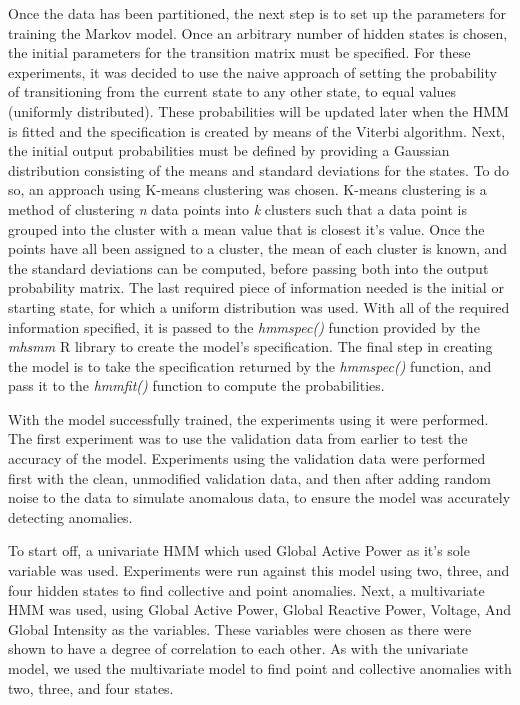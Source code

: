 \documentclass[letterpaper, 11pt]{article}%
\begin{document}
Once the data has been partitioned, the next step is to set up the parameters for training the Markov model. Once an arbitrary number of hidden states is chosen, the initial parameters for the transition matrix must be specified. For these experiments, it was decided to use the naive approach of setting the probability of transitioning from the current state to any other state, to equal values (uniformly distributed). These probabilities will be updated later when the HMM is fitted and the specification is created by means of the Viterbi algorithm. Next, the initial output probabilities must be defined by providing a Gaussian distribution consisting of the means and standard deviations for the states. To do so, an approach using K-means clustering was chosen. K-means clustering is a method of clustering \textit{n} data points into \textit{k} clusters such that a data point is grouped into the cluster with a mean value that is closest it's value. Once the points have all been assigned to a cluster, the mean of each cluster is known, and the standard deviations can be computed, before passing both into the output probability matrix. The last required piece of information needed is the initial or starting state, for which a uniform distribution was used. With all of the required information specified, it is passed to the \textit{hmmspec()} function provided by the \textit{mhsmm} R library to create the model's specification. The final step in creating the model is to take the specification returned by the \textit{hmmspec()} function, and pass it to the \textit{hmmfit()} function to compute the probabilities.

With the model successfully trained, the experiments using it were performed. The first experiment was to use the validation data from earlier to test the accuracy of the model. Experiments using the validation data were performed first with the clean, unmodified validation data, and then after adding random noise to the data to simulate anomalous data, to ensure the model was accurately detecting anomalies.

To start off, a univariate HMM which used Global Active Power as it's sole variable was used. Experiments were run against this model using two, three, and four hidden states to find collective and point anomalies. Next, a multivariate HMM was used, using Global Active Power, Global Reactive Power, Voltage, And Global Intensity as the variables. These variables were chosen as there were shown to have a degree of correlation to each other. As with the univariate model, we used the multivariate model to find point and collective anomalies with two, three, and four states.
\end{document}
